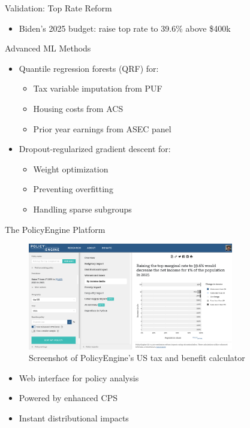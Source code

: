\documentclass{beamer}
\begin{document}
\begin{frame}{Validation: Top Rate Reform}
    \begin{itemize}
        \item Biden's 2025 budget: raise top rate to 39.6\% above \$400k
    \end{itemize}
    \begin{table}
        \centering
        
    \end{table}
\end{frame}

\begin{frame}{Advanced ML Methods}
    \begin{itemize}
        \item Quantile regression forests (QRF) for:
        \begin{itemize}
            \item Tax variable imputation from PUF
            \item Housing costs from ACS
            \item Prior year earnings from ASEC panel
        \end{itemize}
        \pause
        \item Dropout-regularized gradient descent for:
        \begin{itemize}
            \item Weight optimization
            \item Preventing overfitting
            \item Handling sparse subgroups
        \end{itemize}
    \end{itemize}
\end{frame}

\begin{frame}{The PolicyEngine Platform}
    \begin{figure}
        \centering
        \includegraphics[width=0.8\textwidth]{../../paper/figures/policyengine_results.png}
        \caption{Screenshot of PolicyEngine's US tax and benefit calculator}
    \end{figure}
    \begin{itemize}
        \item Web interface for policy analysis
        \item Powered by enhanced CPS
        \item Instant distributional impacts
    \end{itemize}
\end{frame}
\end{document}
